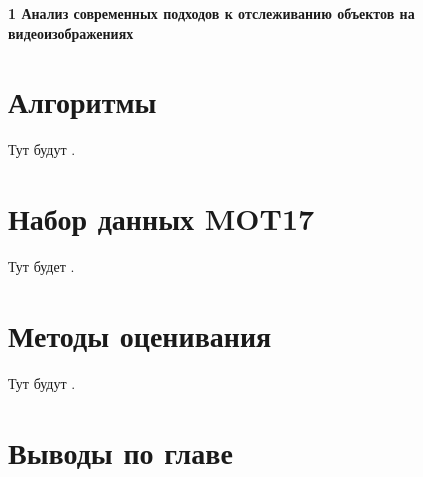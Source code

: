 \newpage
\begin{flushleft}
  \textbf{\large 1 Анализ современных подходов к отслеживанию объектов на видеоизображениях}
\end{flushleft}

\section{Алгоритмы}
Тут будут \cite{aharon2022bot, cao2023observation, du2023strongsort, Maggiolino2023, stadler2023improved, zhang2022bytetrack}.

\section{Набор данных MOT17}
Тут будет \cite{dendorfer2021motchallenge}.

\section{Методы оценивания}
Тут будут \cite{luiten2021hota, bernardin2008evaluating, ristani2016performance}.

\section{Выводы по главе}
